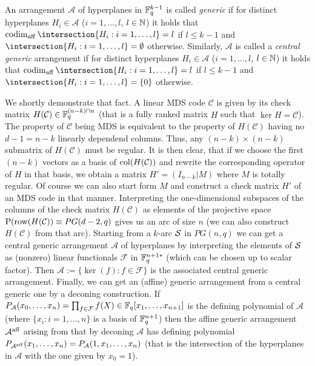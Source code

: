 \documentclass[a4paper]{article}
\begin{document}
\begin{definition}
    An arrangement $\mathcal{A}$ of hyperplanes in $\mathbb{F}_{q}^{k-1}$ is called \emph{generic} if for distinct hyperplanes $H_i\in\mathcal{A}$ ($i=1,\ldots,l$, $l\in\mathbb{N}$) it holds that $\codim_{\aff}\intersection\{H_i:i=1,\ldots,l\}=l$ if $l\leq k-1$ and $\intersection\{H_i:i=1,\ldots,l\}=\emptyset$ otherwise.
    Similarly, $\mathcal{A}$ is called a \emph{central generic} arrangement if for distinct hyperplanes $H_i\in\mathcal{A}$ ($i=1,\ldots,l$, $l\in\mathbb{N}$) it holds that $\codim_{\aff}\intersection\{H_i:i=1,\ldots,l\}=l$ if $l\leq k-1$ and $\intersection\{H_i:i=1,\ldots,l\}=\{0\}$ otherwise.
\end{definition}

We shortly demonstrate that fact.
A linear MDS code $\mathcal{C}$ is given by its check matrix $H(\mathcal{C})\in\mathbb{F}_{q}^{(n-k)\mathbin{\sqcap} n}$ (that is a fully ranked matrix $H$ such that $\ker H=\mathcal{C}$). The property of $\mathcal{C}$ being MDS is equivalent to the property of $H(\mathcal{C})$ having no $d-1=n-k$ linearly dependend columns. Thus, any $(n-k)\times(n-k)$ submatrix of $H(\mathcal{C})$ must be regular. It is then clear, that if we choose the first $(n-k)$ vectors as a basis of $\mathop\mathrm{col}(H(\mathcal{C}))$ and rewrite the corresponding operator of $H$ in that basis, we obtain a matrix $H'=(I_{n-k}|M)$ where $M$ is totally regular. Of course we can also start form $M$ and construct a check matrix $H'$ of an MDS code in that manner. 
Interpreting the one-dimensional subspaces of the columns of the check matrix $H(\mathcal{C})$ as elements of the projective space $\proj(\row(H(\mathcal{C}))\iso PG(d-2,q)$ gives us an arc of size $n$ (we can also construct $H(\mathcal{C})$ from that arc).
Starting from a $k$-arc $\mathcal{S}$ in $PG(n,q)$ we can get a central generic arrangement $\mathcal{A}$ of hyperplanes by interpreting the elements of $\mathcal{S}$ as (nonzero) linear functionals $\mathcal{F}$ in $\mathbb{F}_{q}^{n+1*}$ (which can be chosen up to scalar factor). Then $\mathcal{A}:=\{\ker(f):f\in \mathcal{F}\}$ is the associated central generic arrangement.
Finally, we can get an (affine) generic arrangement from a central generic one by a deconing construction. If $P_{\mathcal{A}}(x_0,\ldots,x_n)=\prod_{f\in\mathcal{F}}{f(X)}\in\mathbb{F}_{q}[x_1,\ldots,x_{n+1}]$ is the defining polynomial of $\mathcal{A}$ (where $\{x_i:i=1,\ldots,n\}$ is a basis of $\mathbb{F}_{q}^{n+1}$) then the affine generic arrangement $\mathcal{A}^{\mathop\mathrm{aff}}$ arising from that by deconing $\mathcal{A}$ has defining polynomial $P_{\mathcal{A}^{\mathop\mathrm{aff}}}(x_1,\ldots,x_n)=P_{\mathcal{A}}(1,x_1,\ldots,x_n)$ (that is the intersection of the hyperplanes in $\mathcal{A}$ with the one given by $x_0=1$).
\end{document}
